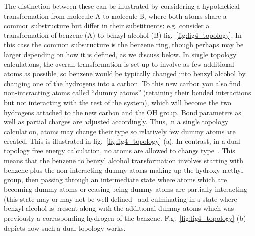 \documentclass[9pt,bestpractices]{livecoms}
\begin{document}
The distinction between these can be illustrated by considering a hypothetical transformation from molecule A to molecule B, where both atoms share a common substructure but differ in their substituents; e.g. consider a transformation of benzene (A) to benzyl alcohol (B) fig.~\ref{fig:fig4_topology}.
In this case the common substructure is the benzene ring, though perhaps may be larger depending on how it is defined, as we discuss below.
In single topology calculations, the overall transformation is set up to involve as few additional atoms as possible, so benzene would be typically changed into benzyl alcohol by changing one of the hydrogens into a carbon. To this new carbon you also find non-interacting atoms called ``dummy atoms'' (retaining their bonded interactions but not interacting with the rest of the system), which will become the two hydrogens attached to the new carbon and the OH group. Bond parameters as well as partial charges are adjusted accordingly. 
Thus, in a single topology calculation, atoms may change their type so relatively few dummy atoms are created. This is illustrated in fig.~\ref{fig:fig4_topology} (a). 
In contrast, in a dual topology free energy calculation, no atoms are allowed to change type~\cite{shirts2012best}. This means that the benzene to benzyl alcohol transformation involves starting with benzene plus the non-interacting dummy atoms making up the hydroxy methyl group, then passing through an intermediate state where atoms which are becoming dummy atoms or ceasing being dummy atoms are partially interacting (this state may or may not be well defined~\cite{mobley2014blind}  and culminating in a state where benzyl alcohol is present along with the additional dummy atoms which was previously a corresponding hydrogen of the benzene. Fig.~\ref{fig:fig4_topology} (b) depicts how such a dual topology works. 
\end{document}
